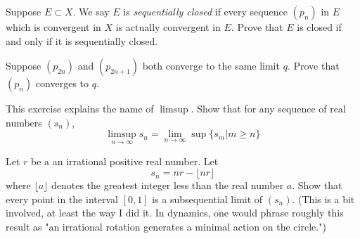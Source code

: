 \documentclass[12pt,letterpaper,reqno]{amsart}
\numberwithin{equation}{section}
\newcommand{\ti}[1]{\textit{#1}}
\begin{document}
\noindent\hrulefill



\begin{exercise}
Suppose $E \subset X$. We say $E$ is \ti{sequentially closed} if every sequence $(p_n)$ in $E$ which is convergent in $X$
is actually convergent in $E$. Prove that $E$ is closed if and only if it is sequentially closed.
\end{exercise}

\begin{exercise}
Suppose $(p_{2n})$ and $(p_{2n+1})$ both converge to the same limit $q$. 
Prove that $(p_n)$ converges to $q$. 
\end{exercise}



\begin{exercise} This exercise explains the name of $\limsup$. Show that for any sequence of real numbers $(s_n)$, 
\[ \limsup_{n\to\infty} s_n = \lim_{n\to\infty} \sup\{s_m | m\geq n\}\]
\end{exercise}

\begin{exercise}
Let $r$ be a an irrational positive real number. Let \[s_n = nr - \lfloor nr \rfloor\] where $\lfloor a \rfloor$ denotes the greatest integer less than the real number $a$. Show that every point in the interval $[0,1]$ is a subsequential limit of $(s_n)$. (This is a bit involved, at least the way I did it. In dynamics, one would phrase roughly this result as "an irrational rotation generates a minimal action on the circle.")
\end{exercise}

\end{document}

